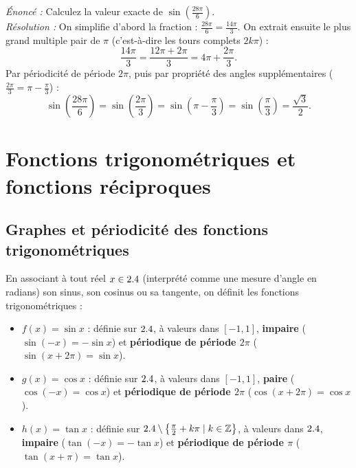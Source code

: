 \begin{exemple}
\emph{Énoncé :} Calculez la valeur exacte de $\sin\left(\frac{28\pi}{6}\right)$.\\
\emph{Résolution :} On simplifie d'abord la fraction : $\frac{28\pi}{6} = \frac{14\pi}{3}$. On extrait ensuite le plus grand multiple pair de $\pi$ (c'est-à-dire les tours complets $2k\pi$) :
\[
    \frac{14\pi}{3} = \frac{12\pi + 2\pi}{3} = 4\pi + \frac{2\pi}{3}.
\]
Par périodicité de période $2\pi$, puis par propriété des angles supplémentaires ($\frac{2\pi}{3} = \pi - \frac{\pi}{3}$) :
\[
    \sin\left(\frac{28\pi}{6}\right) = \sin\left(\frac{2\pi}{3}\right) = \sin\left(\pi - \frac{\pi}{3}\right) = \sin\left(\frac{\pi}{3}\right) = \frac{\sqrt{3}}{2}.
\]
\end{exemple}

\section{Fonctions trigonométriques et fonctions réciproques}

\subsection{Graphes et périodicité des fonctions trigonométriques}

En associant à tout réel $x \in 2.4$ (interprété comme une mesure d'angle en radians) son sinus, son cosinus ou sa tangente, on définit les fonctions trigonométriques :
\begin{itemize}
    \item $f(x) = \sin x$ : définie sur $2.4$, à valeurs dans $[-1, 1]$, \textbf{impaire} ($\sin(-x) = -\sin x$) et \textbf{périodique de période $2\pi$} ($\sin(x+2\pi) = \sin x$).
    \item $g(x) = \cos x$ : définie sur $2.4$, à valeurs dans $[-1, 1]$, \textbf{paire} ($\cos(-x) = \cos x$) et \textbf{périodique de période $2\pi$} ($\cos(x+2\pi) = \cos x$).
    \item $h(x) = \tan x$ : définie sur $2.4 \setminus \left\{\frac{\pi}{2} + k\pi \mid k \in \mathbb{Z}\right\}$, à valeurs dans $2.4$, \textbf{impaire} ($\tan(-x) = -\tan x$) et \textbf{périodique de période $\pi$} ($\tan(x+\pi) = \tan x$).
\end{itemize}

